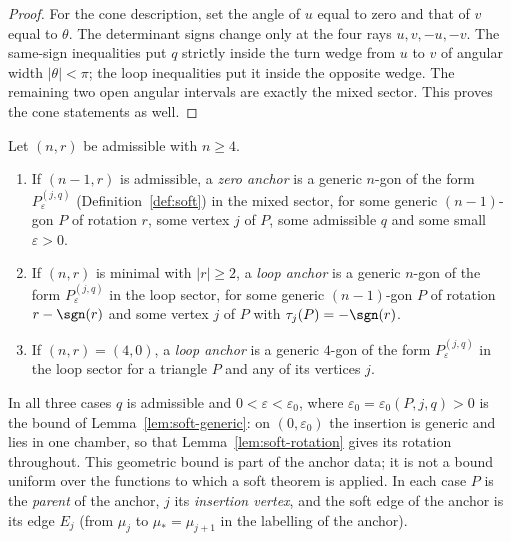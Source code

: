 \begin{proof}
For the cone description, set the angle of $u$ equal to zero and that
of $v$ equal to $\theta$. The determinant signs change only at the
four rays $u,v,-u,-v$. The same-sign inequalities put $q$ strictly
inside the turn wedge from $u$ to $v$ of angular width $|\theta|<\pi$;
the loop inequalities put it inside the opposite wedge. The remaining
two open angular intervals are exactly the mixed sector. This proves
the cone statements as well.
\end{proof}

\begin{definition}[anchors]\label{def:anchors}\leanok{}
Let $(n,r)$ be admissible with $n\geq4$.
\begin{enumerate}
\item[(Z)] If $(n-1,r)$ is admissible, a \emph{zero anchor} is a generic
$n$-gon of the form $P^{(j,q)}_\varepsilon$ (Definition~\ref{def:soft}) in
the mixed sector, for some generic $(n-1)$-gon $P$ of rotation $r$, some
vertex $j$ of $P$, some admissible $q$ and some small $\varepsilon>0$.
\item[(L)] If $(n,r)$ is minimal with $|r|\geq2$, a \emph{loop anchor} is a
generic $n$-gon of the form $P^{(j,q)}_\varepsilon$ in the loop sector, for
some generic $(n-1)$-gon $P$ of rotation $r-\sgn(r)$ and some vertex $j$ of
$P$ with $\tau_j(P)=-\sgn(r)$.
\item[(L$_0$)] If $(n,r)=(4,0)$, a \emph{loop anchor} is a generic $4$-gon
of the form $P^{(j,q)}_\varepsilon$ in the loop sector for a triangle $P$
and any of its vertices $j$.
\end{enumerate}
In all three cases $q$ is admissible and $0<\varepsilon<\varepsilon_0$, where
$\varepsilon_0=\varepsilon_0(P,j,q)>0$ is the bound of
Lemma~\ref{lem:soft-generic}: on $(0,\varepsilon_0)$ the insertion is generic
and lies in one chamber, so that Lemma~\ref{lem:soft-rotation} gives its
rotation throughout. This geometric bound is part of the anchor data; it is
not a bound uniform over the functions to which a soft theorem is applied.
In each case $P$ is the \emph{parent} of the anchor, $j$ its \emph{insertion
vertex}, and the soft edge of the anchor is its edge $E_j$ (from $\mu_j$ to
$\mu_*=\mu_{j+1}$ in the labelling of the anchor).
\end{definition}

